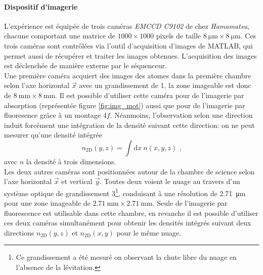 \paragraph*{Dispositif d'imagerie}
L'expérience est équipée de trois caméras \textit{EMCCD C9102} de chez \textit{Hamamatsu}, chacune comportant une matrice de $1000 \times 1000$ pixels de taille $\SI{8}{\micro\metre} \times \SI{8}{\micro\metre}$. Ces trois caméras sont contrôlées via l'outil d'acquisition d'images de MATLAB, qui permet aussi de récupérer et traiter les images obtenues. L'acquisition des images est déclenchée de manière externe par le séquenceur.\\
Une première caméra acquiert des images des atomes dans la première chambre selon l'axe horizontal $\vec{x}$ avec un grandissement de 1, la zone imageable est donc de $\SI{8}{\milli\metre} \times \SI{8}{\milli\metre}$. Il est possible d'utiliser cette caméra pour de l'imagerie par absorption (représentée figure \ref{fig:img_mot}) aussi que pour de l'imagerie par fluoresence grâce à un montage 4$f$. Néanmoins, l'observation selon une direction induit forcément une intégration de la densité suivant cette direction: on ne peut mesurer qu'une densité intégrée
\begin{equation}
n_{\mathrm{2D}}(y,z) =\int{\mathrm{d}x \: n(x,y,z)} \text{ ,}
\end{equation}
avec $n$ la densité à trois dimensions.\\
Les deux autres caméras sont positionnées autour de la chambre de science selon l'axe horizontal $\vec{x}$ et vertical $\vec{y}$. Toutes deux voient le nuage au travers d'un système optique de grandissement 3\footnote{Ce grandissement a été mesuré on observant la chute libre du nuage en l'absence de la lévitation.}, conduisant à une résolution de \SI{2.71}{\micro\metre} pour une zone imageable de $\SI{2.71}{\milli\metre} \times \SI{2.71}{\milli\metre}$. Seule de l'imagerie par fluorescence est utilisable dans cette chambre, en revanche il est possible d'utiliser ces deux caméras simultanément pour obtenir les densités intégrés suivant deux directions $n_{\mathrm{2D}}(y,z)$ et $n_{\mathrm{2D}}(x,y)$ pour le même nuage.

